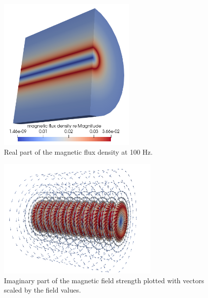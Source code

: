 \begin{figure}[H]
\centering
\includegraphics[width=0.6\textwidth]{mag-flux-dens-re-100}
\caption{Real part of the magnetic flux density at 100 Hz.}
\label{fg:BfieldWire-re-100}
\end{figure}  

\begin{figure}[H]
\centering
\includegraphics[width=0.7\textwidth]{WireBfieldImVectors}
\caption{Imaginary part of the magnetic field strength plotted with vectors scaled by the field values.}
\label{fg:BfieldWireVectors}
\end{figure}  

